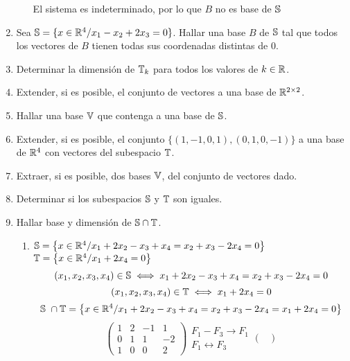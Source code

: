 \documentclass[../practica.root.tex]{subfiles}
\begin{document}
\begin{enumerate}
\begin{enumerate}
\[                    \]
                    El sistema es indeterminado, por lo que $B$ no es base de $\S$
          \end{enumerate}
    \item Sea $ \S = \{ x \in \R^4 / x_1 - x_2 + 2x_3 = 0 \}$. Hallar una base $B$ de $\S$ tal que todos los vectores de $B$ tienen todas sus coordenadas distintas de 0.
    \item Determinar la dimensión de $\T_k$ para todos los valores de $k \in \R$.
    \item Extender, si es posible, el conjunto de vectores a una base de $\R^{2\x2}$.
    \item Hallar una base $\V$ que contenga a una base de $\S$.
    \item Extender, si es posible, el conjunto $\{ (1,-1,0,1),(0,1,0,-1) \}$ a una base de $\R^4$ con vectores del subespacio $\T$.
    \item Extraer, si es posible, dos bases $\V$, del conjunto de vectores dado.
    \item Determinar si los subespacios $\S$ y $\T$ son iguales.
    \item Hallar base y dimensión de $\S \cap \T$.
          \begin{enumerate}
              \item $\S = \left\{ x \in \R^4 / x_1 + 2x_2 - x_3 + x_4 = x_2 + x_3 - 2x_4 = 0 \right\}$ \\ $\T = \left\{ x \in \R^4 / x_1 + 2x_4 = 0 \right\}$
                    \[ (x_1, x_2, x_3, x_4) \in \S \iff x_1 + 2x_2 - x_3 + x_4 = x_2 + x_3 - 2x_4 = 0 \]
                    \[ (x_1, x_2, x_3, x_4) \in \T \iff x_1 + 2x_4 = 0 \]
                    \[ \S \cap \T = \left\{ x \in \R^4 / x_1 + 2x_2 - x_3 + x_4 = x_2 + x_3 - 2x_4 = x_1 + 2x_4 = 0 \right\} \]
                    \[
                        \begin{pmatrix}
                            1 & 2 & -1 & 1  \\
                            0 & 1 & 1  & -2 \\
                            1 & 0 & 0  & 2
                        \end{pmatrix}
                        \begin{array}{rl}
                            F_1 - F_3 \to F_1 \\
                            F_1 \leftrightarrow F_3
                        \end{array}
                        \begin{pmatrix}

\end{pmatrix}\]
\end{enumerate}
\end{enumerate}
\end{document}
